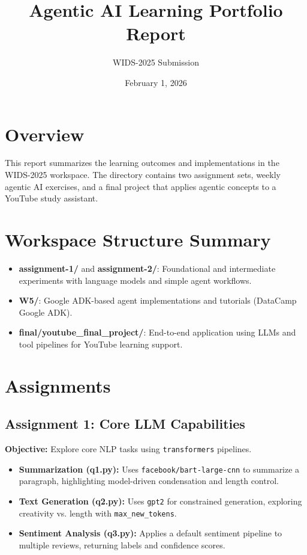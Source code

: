 \documentclass[11pt]{article}
\title{Agentic AI Learning Portfolio Report}
\author{WIDS-2025 Submission}
\date{February 1, 2026}
\begin{document}
\maketitle
\tableofcontents
\newpage

\section{Overview}
This report summarizes the learning outcomes and implementations in the WIDS-2025 workspace. The directory contains two assignment sets, weekly agentic AI exercises, and a final project that applies agentic concepts to a YouTube study assistant.

\section{Workspace Structure Summary}
\begin{itemize}[leftmargin=2em]
    \item \textbf{assignment-1/} and \textbf{assignment-2/}: Foundational and intermediate experiments with language models and simple agent workflows.
    \item \textbf{W5/}: Google ADK-based agent implementations and tutorials (DataCamp Google ADK).
    \item \textbf{final/youtube\_final\_project/}: End-to-end application using LLMs and tool pipelines for YouTube learning support.
\end{itemize}

\section{Assignments}
\subsection{Assignment 1: Core LLM Capabilities}
\textbf{Objective:} Explore core NLP tasks using \texttt{transformers} pipelines.

\begin{itemize}[leftmargin=2em]
    \item \textbf{Summarization (q1.py):} Uses \texttt{facebook/bart-large-cnn} to summarize a paragraph, highlighting model-driven condensation and length control.
    \item \textbf{Text Generation (q2.py):} Uses \texttt{gpt2} for constrained generation, exploring creativity vs. length with \texttt{max\_new\_tokens}.
    \item \textbf{Sentiment Analysis (q3.py):} Applies a default sentiment pipeline to multiple reviews, returning labels and confidence scores.
\end{itemize}
\end{document}
